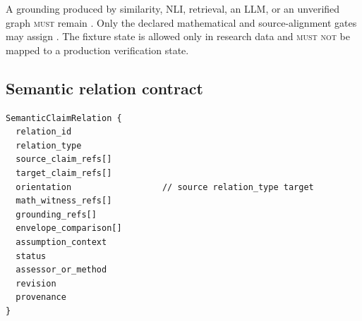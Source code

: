 A grounding produced by similarity, NLI, retrieval, an LLM, or an unverified graph \textsc{must} remain . Only the declared mathematical and source-alignment gates may assign . The fixture state  is allowed only in research data and \textsc{must not} be mapped to a production verification state.

\subsection{Semantic relation contract}

\begin{lstlisting}[style=interface]
SemanticClaimRelation {
  relation_id
  relation_type
  source_claim_refs[]
  target_claim_refs[]
  orientation                  // source relation_type target
  math_witness_refs[]
  grounding_refs[]
  envelope_comparison[]
  assumption_context
  status
  assessor_or_method
  revision
  provenance
}
\end{lstlisting}

